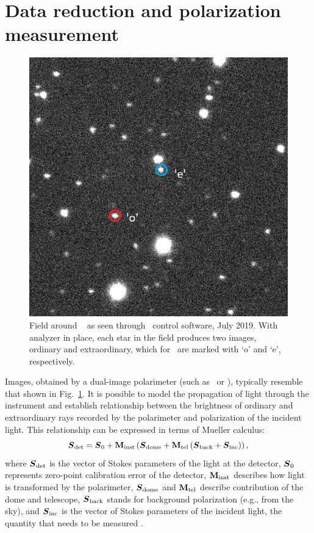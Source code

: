 \section{Data reduction and polarization measurement}
\label{sec:data_red}
\begin{figure}
    \centering
    \includegraphics[keepaspectratio, width = 0.9\linewidth]{images/MAXI_Conv_Pol.png}
    \caption{
        Field around \MAXI\ \citep{Kawamuro2018, Denisenko2018} as seen through \DUF\ control software, July 2019.
        With analyzer in place, each star in the field produces two images, ordinary and extraordinary, which for \MAXI\ are marked with `o' and `e', respectively.
        }
    \label{fig:dipol-uf-maxi}
\end{figure}
Images, obtained by a dual-image polarimeter (such as \DP\ or \DUF), typically resemble that shown in Fig.~\ref{fig:dipol-uf-maxi}.
It is possible to model the propagation of light through the instrument and establish relationship between the brightness of ordinary and extraordinary rays recorded by the polarimeter and polarization of the incident light.
This relationship can be expressed in terms of Mueller calculus:
\begin{equation}
    \boldsymbol{S}_{\mathrm{det}} = \boldsymbol{S}_0 + \mathbf{M}_{\mathrm{inst}} \left(\boldsymbol{S}_{\mathrm{dome}} + \mathbf{M}_{\mathrm{tel}} \left(\boldsymbol{S}_{\mathrm{back}} + \boldsymbol{S}_{\mathrm{inc}}\right)\right),
\end{equation}
where $\boldsymbol{S}_{\mathrm{det}}$ is the vector of Stokes parameters of the light at the detector, $\boldsymbol{S}_0$ represents zero-point calibration error of the detector,  $\mathbf{M}_{\mathrm{inst}}$ describes how light is transformed by the polarimeter, $\boldsymbol{S}_{\mathrm{dome}}$ and $\mathbf{M}_{\mathrm{tel}}$ describe contribution of the dome and telescope, $\boldsymbol{S}_{\mathrm{back}}$ stands for background polarization (e.g., from the sky), and $\boldsymbol{S}_{\mathrm{inc}}$ is the vector of Stokes parameters of the incident light, the quantity that needs to be measured \citep{AstronomicalPolarimetry}.
